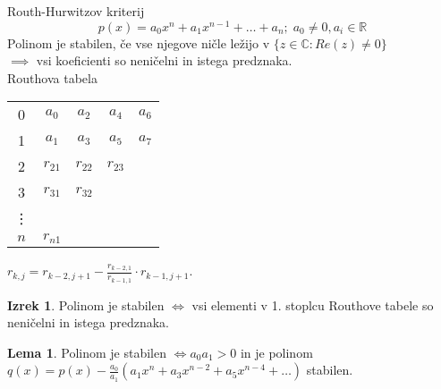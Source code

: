 \documentclass[a4paper, 12pt]{book}
\theoremstyle{definition}
\newtheorem{lemma}[counter]{Lema}
\newtheorem{theorem}[counter]{Izrek}
\theoremstyle{remark}
\newcommand{\R}{\mathbb{R}}
\newcommand{\C}{\mathbb{C}}
\begin{document}
Routh-Hurwitzov kriterij
\begin{equation}
    \label{eq:RH-poly}
    p(x) = a_0 x^n + a_1 x^{n-1} + \dots + a_n; \; a_0 \neq 0, a_i \in \R
\end{equation}
Polinom je stabilen, če vse njegove ničle ležijo v $\{z \in \C: Re(z) \neq 0\}$ \\
$\implies$ vsi koeficienti so neničelni in istega predznaka. \\
Routhova tabela
\begin{center}
    \begin{tabular}{c | c c c c}
        & & & & \\
        \hline
        0 & $a_{0}$ & $a_{2}$ & $a_{4}$ & $a_{6}$ \\
        1 & $a_{1}$ & $a_{3}$ & $a_{5}$ & $a_{7}$ \\
        2 & $r_{21}$ & $r_{22}$ & $r_{23}$ & \\
        3 & $r_{31}$ & $r_{32}$ & & \\
        \vdots & & & & \\
        $n$ & $r_{n1}$
    \end{tabular}
\end{center}
$r_{k,j} = r_{k-2,j+1} - \frac{r_{k-2,1}}{r_{k-1,1}} \cdot r_{k-1,j+1}$.
\begin{theorem}
    Polinom  je stabilen $\iff$ vsi elementi v 1. stoplcu
    Routhove tabele so neničelni in istega predznaka.
\end{theorem}
\begin{lemma}
    Polinom  je stabilen $\iff a_0 a_1 > 0$ in je polinom \\
    $q(x) = p(x) - \frac{a_0}{a_1} \left(a_1 x^n + a_3 x^{n-2} + a_5 x^{n-4} + \dots \right)$
    stabilen.
\end{lemma}
\end{document}
